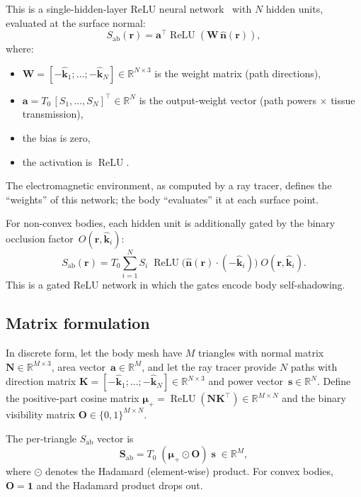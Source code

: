 \documentclass[11pt,a4paper]{article}
\theoremstyle{definition}      %
\newcommand{\khat}{\hat{\bm{k}}}
\newcommand{\nhat}{\hat{\bm{n}}}
\newcommand{\rr}{\mathbf{r}}
\newcommand{\Sab}{S_{\mathrm{ab}}}
\DeclareMathOperator{\ReLU}{ReLU}
\begin{document}
This is a single-hidden-layer ReLU neural network~\cite{NairHinton2010,Goodfellow2016} with $N$ hidden
units, evaluated at the surface normal:
\begin{equation}\label{eq:nn}
  \boxed{\Sab(\rr) = \mathbf{a}^\top\ReLU(\mathbf{W}\,\nhat(\rr)),}
\end{equation}
where:
\begin{itemize}[nosep]
\item $\mathbf{W}=[-\khat_1;\ldots;-\khat_N]\in\mathbb{R}^{N\times 3}$
  is the weight matrix (path directions),
\item $\mathbf{a}=T_0\,[S_1,\ldots,S_N]^\top\in\mathbb{R}^N$ is the
  output-weight vector (path powers $\times$ tissue transmission),
\item the bias is zero,
\item the activation is $\ReLU$.
\end{itemize}

The electromagnetic environment, as computed by a ray tracer, defines
the ``weights'' of this network; the body ``evaluates'' it at each
surface point.

For non-convex bodies, each hidden unit is additionally gated by the
binary occlusion factor~$O(\rr,\khat_i)$:
\begin{equation}\label{eq:gated-relu}
  \Sab(\rr) = T_0\sum_{i=1}^{N}S_i\;
  \ReLU\!\bigl(\nhat(\rr)\cdot(-\khat_i)\bigr)\;O(\rr,\khat_i).
\end{equation}
This is a gated ReLU network in which the gates encode body
self-shadowing.

\subsection{Matrix formulation}\label{sec:matrix}

In discrete form, let the body mesh have $M$ triangles with
normal matrix $\mathbf{N}\in\mathbb{R}^{M\times 3}$, area
vector~$\mathbf{a}\in\mathbb{R}^M$, and let the ray tracer provide
$N$ paths with direction matrix
$\mathbf{K}=[-\khat_1;\ldots;-\khat_N]\in\mathbb{R}^{N\times 3}$ and
power vector~$\mathbf{s}\in\mathbb{R}^N$.  Define the positive-part
cosine matrix
$\bm{\mu}_+=\ReLU(\mathbf{N}\mathbf{K}^\top)\in\mathbb{R}^{M\times N}$
and the binary visibility matrix
$\mathbf{O}\in\{0,1\}^{M\times N}$.

The per-triangle $\Sab$ vector is
\begin{equation}\label{eq:Sab-mat}
  \mathbf{S}_{\mathrm{ab}} = T_0\;(\bm{\mu}_+\odot\mathbf{O})\;\mathbf{s}
  \;\in\mathbb{R}^M,
\end{equation}
where $\odot$ denotes the Hadamard (element-wise) product.  For convex
bodies, $\mathbf{O}=\mathbf{1}$ and the Hadamard product drops out.
\end{document}
